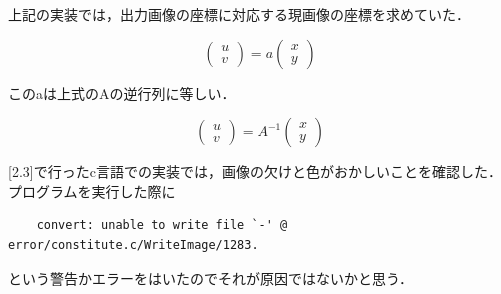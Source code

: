 \documentclass[11pt]{jarticle}
\begin{document}
上記の実装では，出力画像の座標に対応する現画像の座標を求めていた．

\[
    \left(
        \begin{array}{c}
           u \\
           v 
        \end{array}
      \right)
      =a
    \left(
    \begin{array}{c}
       x \\
       y 
    \end{array}
  \right)
\]

このaは上式のAの逆行列に等しい．

\[
    \left(
        \begin{array}{c}
           u \\
           v 
        \end{array}
      \right)
      =A^{-1}
    \left(
    \begin{array}{c}
       x \\
       y 
    \end{array}
  \right)
\]


[2.3]で行ったc言語での実装では，画像の欠けと色がおかしいことを確認した．
プログラムを実行した際に

\begin{lstlisting}
    convert: unable to write file `-' @ error/constitute.c/WriteImage/1283.
\end{lstlisting}
という警告かエラーをはいたのでそれが原因ではないかと思う．
\end{document}
